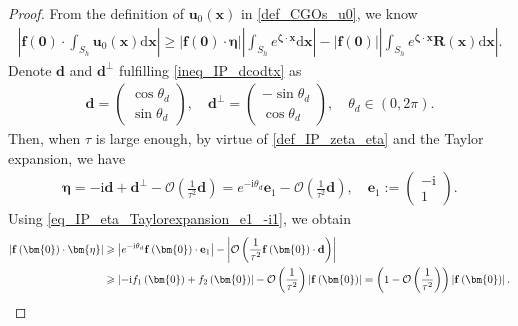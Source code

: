 \documentclass[11pt,reqno,oneside]{amsart}
\theoremstyle{definition}
\theoremstyle{remark}
\numberwithin{equation}{section}
\numberwithin{equation}{section}
\theoremstyle{remark}
\begin{document}
\begin{proof}
	From the definition of $ \mathbf{u}_0\left(\mathbf{x}\right) $ in \eqref{def_CGOs_u0}, we know
	\begin{align*} 
		\left| \mathbf{f}\left(\bm{0}\right) \cdot \int_{S_h} \mathbf{u}_0\left(\mathbf{x}\right) \mathrm{d}\mathbf{x} \right| \geqslant \left| \mathbf{f}\left(\bm{0}\right) \cdot \bm{\eta} \right| \left|\int_{S_h} e^{\bm{\zeta} \cdot \mathbf{x}} \mathrm{d}\mathbf{x} \right| - \left| \mathbf{f}\left(\bm{0}\right) \right| \left|\int_{S_h} e^{\bm{\zeta} \cdot \mathbf{x}} \mathbf{R}\left(\mathbf{x}\right) \mathrm{d}\mathbf{x} \right| .
	\end{align*}
	Denote $ \mathbf{d} $ and $ \mathbf{d}^\perp $ fulfilling \eqref{ineq_IP_dcodtx} as
	\begin{align} \label{eq_IP_ddperp_sincosphi}
		\mathbf{d}=\begin{pmatrix}
			\cos\theta_d \\
			\sin\theta_d
		\end{pmatrix} ,\quad
		\mathbf{d}^\perp=\begin{pmatrix}
			-\sin\theta_d \\
			\cos\theta_d
		\end{pmatrix}, \quad\theta_d\in\left(0,2\pi\right).
	\end{align}
	Then, when $ \tau $ is large enough, by virtue of \eqref{def_IP_zeta_eta} and the Taylor expansion, we have 
	\begin{align} \label{eq_IP_eta_Taylorexpansion_e1_-i1}
		\bm{\eta} = - \mathrm{i}  \mathbf{d} + \mathbf{d}^\perp - \mathcal{O}\left(\frac{1}{\tau^2} \mathbf{d}\right) = e^{-\mathrm{i}\theta_d} \mathbf{e}_1 - \mathcal{O}\left(\frac{1}{\tau^2} \mathbf{d}\right),\quad
		\mathbf{e}_1:=\begin{pmatrix}
			- \mathrm{i} \\
			1
		\end{pmatrix} .
	\end{align}
	Using \eqref{eq_IP_eta_Taylorexpansion_e1_-i1}, we obtain
	\begin{align*} 
		\left| \mathbf{f}\left(\bm{0}\right) \cdot \bm{\eta} \right| & \geqslant \left| e^{-\mathrm{i}\theta_d} \mathbf{f}\left(\bm{0}\right) \cdot \mathbf{e}_1 \right| - \left| \mathcal{O}\left(\frac{1}{\tau^2} \mathbf{f}\left(\bm{0}\right) \cdot\mathbf{d}\right) \right| \notag \\
		& \geqslant \left| -\mathrm{i} f_1\left(\bm{0}\right) + f_2\left(\bm{0}\right) \right| - \mathcal{O}\left(\frac{1}{\tau^2}\right) \left| \mathbf{f}\left(\bm{0}\right) \right| = \left(1-\mathcal{O}\left(\frac{1}{\tau^2}\right) \right) \left| \mathbf{f}\left(\bm{0}\right) \right| .

\end{align*}
\end{proof}
\end{document}
